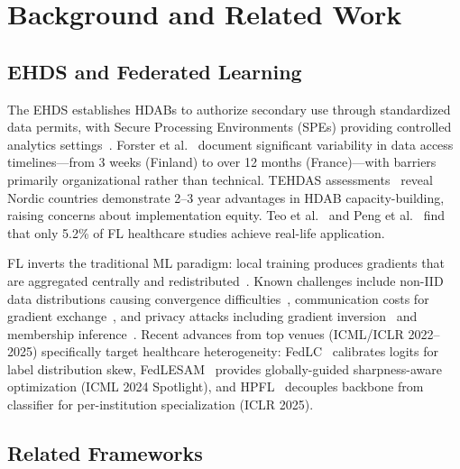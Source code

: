 \documentclass[conference,a4paper]{IEEEtran}
\begin{document}
\section{Background and Related Work}
\label{sec:background}

\subsection{EHDS and Federated Learning}

The EHDS establishes HDABs to authorize secondary use through standardized data permits, with Secure Processing Environments (SPEs) providing controlled analytics settings~\cite{svingel2025hdab}. Forster et al.~\cite{forster2025journeys} document significant variability in data access timelines---from 3 weeks (Finland) to over 12 months (France)---with barriers primarily organizational rather than technical. TEHDAS assessments~\cite{tehdas2024ready} reveal Nordic countries demonstrate 2--3 year advantages in HDAB capacity-building, raising concerns about implementation equity. Teo et al.~\cite{teo2024systematic} and Peng et al.~\cite{peng2024systematic} find that only 5.2\% of FL healthcare studies achieve real-life application.

FL inverts the traditional ML paradigm: local training produces gradients that are aggregated centrally and redistributed~\cite{mcmahan2017communication, li2020federated}. Known challenges include non-IID data distributions causing convergence difficulties~\cite{li2020federated}, communication costs for gradient exchange~\cite{bonawitz2019scale}, and privacy attacks including gradient inversion~\cite{zhu2019deep} and membership inference~\cite{shokri2017membership, carlini2022privacy}. Recent advances from top venues (ICML/ICLR 2022--2025) specifically target healthcare heterogeneity: FedLC~\cite{zhang2022fedlc} calibrates logits for label distribution skew, FedLESAM~\cite{qu2024fedlesam} provides globally-guided sharpness-aware optimization (ICML 2024 Spotlight), and HPFL~\cite{chen2025hpfl} decouples backbone from classifier for per-institution specialization (ICLR 2025).

\subsection{Related Frameworks}
\end{document}
